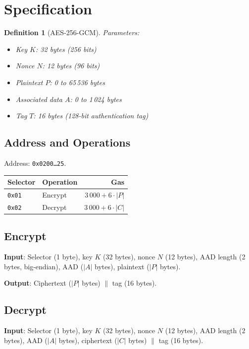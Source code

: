 \documentclass[11pt,a4paper]{article}
\newtheorem{definition}{Definition}
\begin{document}
\section{Specification}

\begin{definition}[AES-256-GCM]
Parameters:
\begin{itemize}
  \item Key $K$: 32 bytes (256 bits)
  \item Nonce $N$: 12 bytes (96 bits)
  \item Plaintext $P$: 0 to 65\,536 bytes
  \item Associated data $A$: 0 to 1\,024 bytes
  \item Tag $T$: 16 bytes (128-bit authentication tag)
\end{itemize}
\end{definition}

\subsection{Address and Operations}

Address: \texttt{0x0200\ldots25}.

\begin{table}[H]
\centering
\begin{tabular}{llr}
\toprule
\textbf{Selector} & \textbf{Operation} & \textbf{Gas} \\
\midrule
\texttt{0x01} & Encrypt & $3\,000 + 6 \cdot |P|$ \\
\texttt{0x02} & Decrypt & $3\,000 + 6 \cdot |C|$ \\
\bottomrule
\end{tabular}
\end{table}

\subsection{Encrypt}

\textbf{Input}: Selector (1 byte), key $K$ (32 bytes), nonce $N$ (12 bytes),
AAD length (2 bytes, big-endian), AAD ($|A|$ bytes), plaintext ($|P|$ bytes).

\textbf{Output}: Ciphertext ($|P|$ bytes) $\|$ tag (16 bytes).

\subsection{Decrypt}

\textbf{Input}: Selector (1 byte), key $K$ (32 bytes), nonce $N$ (12 bytes),
AAD length (2 bytes), AAD ($|A|$ bytes), ciphertext ($|C|$ bytes) $\|$ tag (16 bytes).
\end{document}
